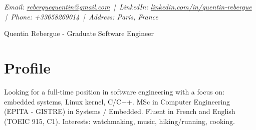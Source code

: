 \documentclass[9pt,a4paper]{article}
\newcommand{\namefont}{\fontsize{18}{22}\selectfont}
\newcommand{\tinyscript}{\fontsize{8}{8}\selectfont}
\begin{document}
\renewcommand\normalsize{\fontsize{10.5}{15}\selectfont}
\normalsize

\begin{center}
  {\tinyscript\itshape
  Email: \href{mailto:reberguequentin@gmail.com}{reberguequentin@gmail.com} \,|\,
  LinkedIn: \href{https://linkedin.com/in/quentin-rebergue}{linkedin.com/in/quentin-rebergue} \,|\,
  Phone: +33658269014 \,|\,
  Address: Paris, France}
\end{center}

\begin{center}
  {\namefont Quentin Rebergue - Graduate Software Engineer}
\end{center}

\section*{Profile}
\begin{tcolorbox}[mybox2]
Looking for a full-time position in software engineering with a focus on: embedded systems, Linux kernel, C/C++. MSc in Computer Engineering (EPITA - GISTRE) in Systems / Embedded. Fluent in French and English (TOEIC 915, C1). Interests: watchmaking, music, hiking/running, cooking.
\end{tcolorbox}
\end{document}

